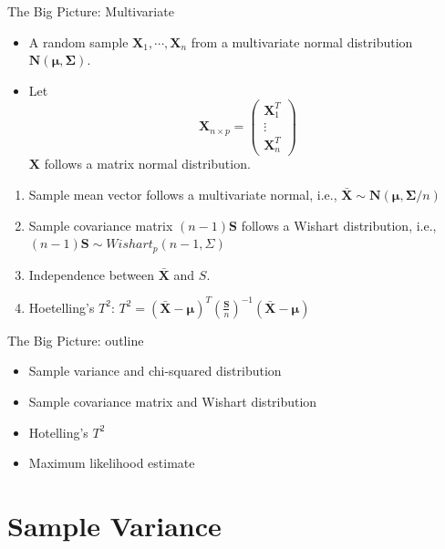 \documentclass[
  ignorenonframetext,
]{beamer}
\providecommand{\tightlist}{%
  \setlength{\itemsep}{0pt}\setlength{\parskip}{0pt}}
\begin{document}
\begin{frame}{The Big Picture: Multivariate}
\protect\hypertarget{the-big-picture-multivariate}{}
\begin{itemize}
\tightlist
\item
  A random sample \(\mathbf X_1, \cdots, \mathbf X_n\) from a
  multivariate normal distribution
  \(\mathbf N(\boldsymbol \mu, \boldsymbol \Sigma)\).
\item
  Let \[\mathbf X_{n\times p}=\begin{pmatrix}
  \mathbf X_1^T \\ \vdots \\\mathbf X_n^T
  \end{pmatrix}\] \(\mathbf X\) follows a matrix normal distribution.
\end{itemize}

\begin{enumerate}
\item
  Sample mean vector follows a multivariate normal, i.e.,
  \(\bar{\mathbf X} \sim \mathbf N(\boldsymbol \mu, \boldsymbol \Sigma/n)\)
\item
  Sample covariance matrix \((n-1)\mathbf S\) follows a Wishart
  distribution, i.e., \((n-1)\mathbf S \sim Wishart_p (n-1, \Sigma)\)
\item
  Independence between \(\bar {\mathbf X}\) and \(S\).
\item
  Hoetelling's \(T^2\):
  \(T^2 = (\bar{\mathbf X} - \boldsymbol \mu)^T\left(\frac{\mathbf S}{n}\right)^{-1} (\bar{\mathbf X} - \boldsymbol \mu)\)
\end{enumerate}
\end{frame}

\begin{frame}{The Big Picture: outline}
\protect\hypertarget{the-big-picture-outline}{}
\begin{itemize}
\tightlist
\item
  Sample variance and chi-squared distribution
\item
  Sample covariance matrix and Wishart distribution
\item
  Hotelling's \(T^2\)
\item
  Maximum likelihood estimate
\end{itemize}
\end{frame}

\hypertarget{sample-variance}{%
\section{Sample Variance}\label{sample-variance}}
\end{document}
